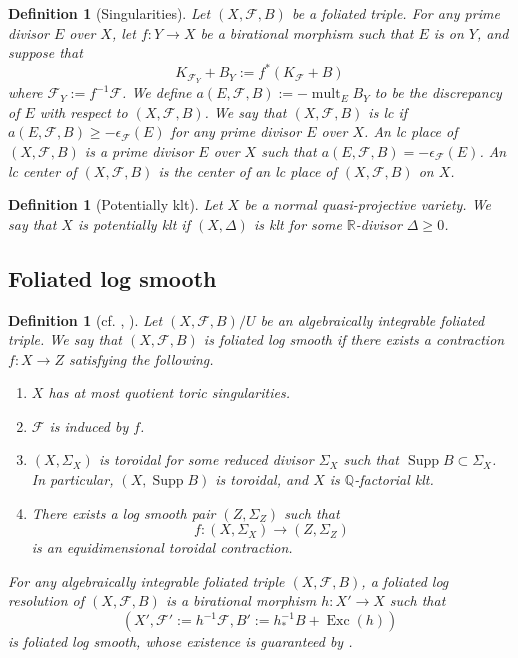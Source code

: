 \documentclass[preprint,12pt]{elsarticle}
\newcommand{\Qq}{\mathbb{Q}}
\newcommand{\Rr}{\mathbb{R}}
\newcommand{\Exc}{\operatorname{Exc}}
\newcommand{\Supp}{\operatorname{Supp}}
\newcommand{\mult}{\operatorname{mult}}
\newcommand{\Ff}{\mathcal{F}}
\newtheorem{defn}[thm]{Definition}
\begin{document}
\begin{defn}[Singularities]\label{defn: foliation singularity}
Let $(X,\Ff,B)$ be a foliated triple. For any prime divisor $E$ over $X$, let $f: Y\rightarrow X$ be a birational morphism such that $E$ is on $Y$, and suppose that
$$K_{\Ff_Y}+B_Y:=f^*(K_\Ff+B)$$
where $\Ff_Y:=f^{-1}\Ff$. We define $a(E,\Ff,B):=-\mult_EB_Y$ to be the \emph{discrepancy} of $E$ with respect to $(X,\Ff,B)$. We say that $(X,\Ff,B)$ is \emph{lc} if $a(E,\Ff,B)\geq -\epsilon_{\Ff}(E)$ for any prime divisor $E$ over $X$. An \emph{lc place} of $(X,\Ff,B)$ is a prime divisor $E$ over $X$ such that $a(E,\Ff,B)=-\epsilon_{\Ff}(E)$. An \emph{lc center} of $(X,\Ff,B)$ is the center of an lc place of $(X,\Ff,B)$ on $X$.
\end{defn}

\begin{defn}[Potentially klt]\label{defn: potentially klt}
Let $X$ be a normal quasi-projective variety. We say that $X$ is \emph{potentially klt} if $(X,\Delta)$ is klt for some $\Rr$-divisor $\Delta\geq 0$. 
\end{defn}

\subsection{Foliated log smooth}

\begin{defn}[{cf. \cite[3.2 Log canonical foliated pairs]{ACSS21}, \cite[Definition 6.2.1]{CHLX23}}]\label{defn: foliated log smooth}
Let $(X,\Ff,B)/U$ be an algebraically integrable foliated triple. We say that $(X,\Ff,B)$ is \emph{foliated log smooth} if there exists a contraction $f: X\rightarrow Z$ satisfying the following.
\begin{enumerate}
  \item $X$ has at most quotient toric singularities.
  \item $\Ff$ is induced by $f$.
  \item $(X,\Sigma_X)$ is toroidal for some reduced divisor $\Sigma_X$ such that $\Supp B\subset\Sigma_X$.  In particular, $(X,\Supp B)$ is toroidal, and $X$ is $\Qq$-factorial klt.
  \item There exists a log smooth pair $(Z,\Sigma_Z)$ such that $$f: (X,\Sigma_X)\rightarrow (Z,\Sigma_Z)$$ is an equidimensional toroidal contraction.
\end{enumerate}

For any algebraically integrable foliated triple $(X,\Ff,B)$, a \emph{foliated log resolution} of $(X,\Ff,B)$ is a birational morphism $h: X'\rightarrow X$ such that 
$$(X',\Ff':=h^{-1}\Ff,B':=h^{-1}_\ast B+\Exc(h))$$ 
is foliated log smooth, whose existence is guaranteed by \cite{AK00,ACSS21,CHLX23}.
\end{defn}
\end{document}
